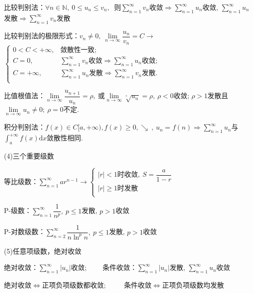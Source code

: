 \documentclass[UTF8]{ctexart}
\newcommand\dif{\mathrm{d}}
\newcommand\no{\noindent}
\newcommand\dis{\displaystyle}
\newcommand\ls{\leqslant}
\newcommand\gs{\geqslant}
\newcommand\limn{\dis\lim\limits_{n\to\infty}}
\newcommand\sumn{\dis\sum\limits_{n=1}^{\infty}}
\newcommand\intd{\dis\int}
\begin{document}
\begin{spacing}{2}
比较判别法：$\forall n\in\mathbb{N},\ 0\ls u_n\ls v_n,\ $
则$\sumn v_n$收敛$\Longrightarrow\sumn u_n$收敛, 
$\sumn u_n$发散$\Longrightarrow\sumn v_n$发散

\vspace{0.3cm}

比较判别法的极限形式：$v_n\neq0,\ \limn \dfrac{u_n}{v_n}=C\longrightarrow$
$\left\{\begin{array}{ll}
0<C<+\infty, &\text{敛散性一致;}\\
C=0,&\sumn v_n\text{收敛}\Longrightarrow\sumn u_n\text{收敛;}\\
C=+\infty,&\sumn u_n\text{发散}\Longrightarrow\sumn v_n\text{发散}.\\
\end{array}\right.$

\vspace{0.3cm}

比值根值法：$\limn\dfrac{u_{n+1}}{u_n}=\rho,\ $或$\limn \sqrt[^n\!]{u_n}=\rho,\ 
\rho<0$收敛; $\rho>1$发散且$\limn u_n\neq0;\ \rho=0$不定.

\vspace{0.2cm}

积分判别法：$f(x)\in C[a,+\infty),f(x)\gs0,\searrow\ ,\ u_n=f(n)\Longrightarrow
\sumn u_n$与$\intd_a^{+\infty} f(x)\dif x$敛散性相同.

\no(4)三个重要级数

等比级数：$\sumn ar^{n-1}\longrightarrow\left\{\begin{array}{l}
|r|<1\text{时收敛},\ S=\dfrac{a}{1-r}\\
|r|\gs1\text{时发散}\\
\end{array}\right.$

P-级数：$\sumn \dfrac{1}{n^p},\ p\ls1$发散, $p>1$收敛

\vspace{0.3cm}

P-对数级数：$\dis\sum\limits_{n=2}^{\infty}\dfrac{1}{n\ln^pn},\ p\ls1$发散, $p>1$收敛

\vspace{0.3cm}

\no(5)任意项级数，绝对收敛

绝对收敛：$\sumn|u_n|$收敛; $\qquad$条件收敛：$\sumn|u_n|$发散, $\sumn u_n$收敛

\vspace{0.2cm}

绝对收敛$\Longleftrightarrow$正项负项级数都收敛;
$\qquad$
条件收敛$\Longleftrightarrow$正项负项级数均发散


\end{spacing}
\end{document}
